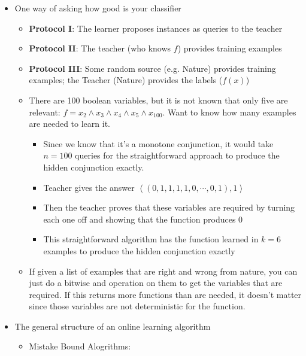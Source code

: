 \documentclass{article}
\begin{document}
\hspace{-1.5em}{\large \bf Mistake Bound Learning}
\begin{itemize}
\item One way of asking how good is your classifier
	\begin{itemize}
	\item {\bf Protocol I}: The learner proposes instances as queries to the teacher
        \item {\bf Protocol II}: The teacher (who knows $f$) provides training examples
        \item {\bf Protocol III}: Some random source (e.g. Nature) provides training examples; the Teacher (Nature) provides the labels ($f(x)$)
        \item There are 100 boolean variables, but it is not known that only five are relevant: $f = x_{2}\wedge x_{3}\wedge x_{4} \wedge x_{5}\wedge x_{100}$. Want to know how many examples are needed to learn it.
          \begin{itemize}
            \item Since we know that it's a monotone conjunction, it would take $n=100$ queries for the straightforward approach to produce the hidden conjunction exactly.
            \item Teacher gives the answer $\left<(0,1,1,1,1,0,\cdots,0,1),1\right>$
            \item Then the teacher proves that these variables are required by turning each one off and showing that the function produces 0
            \item This straightforward algorithm has the function learned in $k=6$ examples to produce the hidden conjunction exactly
          \end{itemize}
          \item If given a list of examples that are right and wrong from nature, you can just do a bitwise and operation on them to get the variables that are required. If this returns more functions than are needed, it doesn't matter since those variables are not deterministic for the function. 
	\end{itemize}
\item The general structure of an online learning algorithm
	\begin{itemize}
          \item Mistake Bound Alogrithms:
          \begin{itemize}
            

\end{itemize}
\end{itemize}
\end{itemize}
\end{document}
